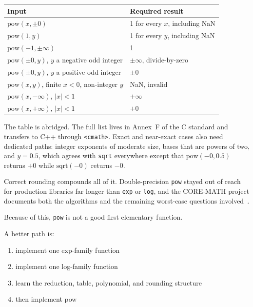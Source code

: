 \documentclass[manuscript, nonacm]{acmart}
\begin{document}
  \begin{table}[tbp]
    \centering
    \begin{tabular}{ll}
      \toprule
      Input                                                 & Required result                \\
      \midrule
      $\mathrm{pow}(x, \pm 0)$                              & 1 for every $x$, including NaN \\
      $\mathrm{pow}(1, y)$                                  & 1 for every $y$, including NaN \\
      $\mathrm{pow}(-1, \pm\infty)$                         & 1                              \\
      $\mathrm{pow}(\pm 0, y)$, $y$ a negative odd integer  & $\pm\infty$, divide-by-zero    \\
      $\mathrm{pow}(\pm 0, y)$, $y$ a positive odd integer  & $\pm 0$                        \\
      $\mathrm{pow}(x, y)$, finite $x < 0$, non-integer $y$ & NaN, invalid                   \\
      $\mathrm{pow}(x, -\infty)$, $|x| < 1$                 & $+\infty$                      \\
      $\mathrm{pow}(x, +\infty)$, $|x| < 1$                 & $+0$                           \\
      \bottomrule
    \end{tabular}
  \end{table}

  The table is abridged. The full list lives in Annex~F of the C standard
  and transfers to C++ through \texttt{<cmath>}. Exact and near-exact
  cases also need dedicated paths: integer exponents of moderate size,
  bases that are powers of two, and $y = 0.5$, which agrees with
  \texttt{sqrt} everywhere except that $\mathrm{pow}(-0, 0.5)$ returns
  $+0$ while $\mathrm{sqrt}(-0)$ returns $-0$.

  Correct rounding compounds all of it. Double-precision \texttt{pow}
  stayed out of reach for production libraries far longer than \texttt{exp}
  or \texttt{log}, and the CORE-MATH project documents both the algorithms
  and the remaining worst-case questions involved~\cite{coremathpaper}.

  Because of this, \texttt{pow} is not a good first elementary function.

  A better path is:

  \begin{enumerate}
    \item implement one exp-family function
    \item implement one log-family function
    \item learn the reduction, table, polynomial, and rounding structure
    \item then implement pow
  \end{enumerate}
\end{document}
